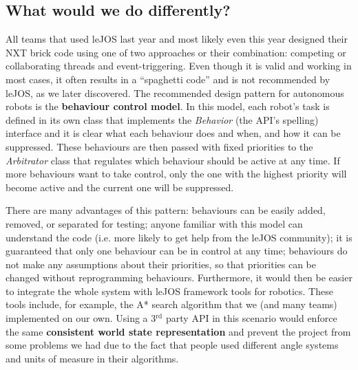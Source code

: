 \subsection{What would we do differently?}
All teams that used leJOS last year and most likely even this year designed their NXT brick code using one of two approaches or their combination: competing or collaborating threads and event-triggering. Even though it is valid and working in most cases, it often results in a ``spaghetti code'' and is not recommended by leJOS, as we later discovered. The recommended design pattern for autonomous robots is the \textbf{behaviour control model}\cite{behaviour}. In this model, each robot's task is defined in its own class that implements the \textsl{Behavior} (the API's spelling) interface and it is clear what each behaviour does and when, and how it can be suppressed. These behaviours are then passed with fixed priorities to the \textsl{Arbitrator} class that regulates which behaviour should be active at any time. If more behaviours want to take control, only the one with the highest priority will become active and the current one will be suppressed.

There are many advantages of this pattern: behaviours can be easily added, removed, or separated for testing; anyone familiar with this model can understand the code (i.e. more likely to get help from the leJOS community); it is guaranteed that only one behaviour can be in control at any time; behaviours do not make any assumptions about their priorities, so that priorities can be changed without reprogramming behaviours. Furthermore, it would then be easier to integrate the whole system with leJOS framework tools for robotics. These tools include, for example, the A* search algorithm that we (and many teams) implemented on our own. Using a 3$^{\textrm{rd}}$ party API in this scenario would enforce the same \textbf{consistent world state representation} and prevent the project from some problems we had due to the fact that people used different angle systems and units of measure in their algorithms.
